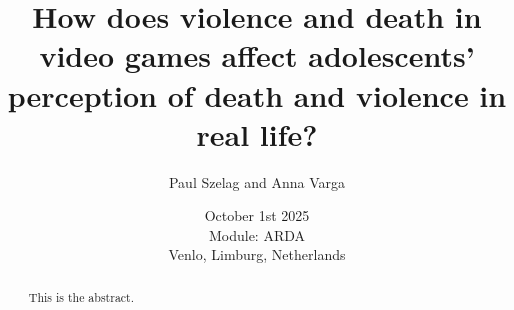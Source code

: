 \documentclass[]{report}
\title{How does violence and death in video games affect adolescents' perception of death and violence in real life?}
\author{Paul Szelag and Anna Varga}
\date{October 1st 2025 \\Module: ARDA \\Venlo, Limburg, Netherlands}
\begin{document}
\maketitle

\begin{abstract}
This is the abstract.
\end{abstract}

\tableofcontents
\setcounter{page}{3}
\pagebreak
{}	
	
 
 
\end{document}
